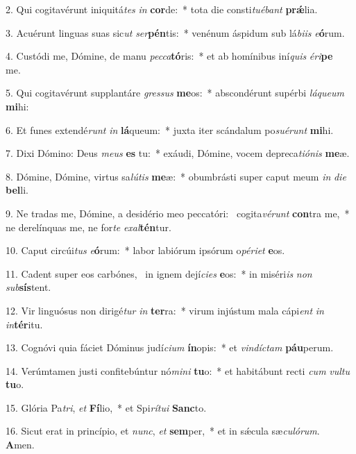 2. Qui cogitavérunt iniquitá\textit{tes} \textit{in} \textbf{cor}de:~*  tota die consti\textit{tu}\textit{é}\textit{bant} \textbf{prǽ}lia.\

3. Acuérunt linguas suas sic\textit{ut} \textit{ser}\textbf{pén}tis:~*  venénum áspidum sub lá\textit{bi}\textit{is} \textit{e}\textbf{ó}rum.\

4. Custódi me, Dómine, de manu \textit{pec}\textit{ca}\textbf{tó}ris:~*  et ab homínibus iní\textit{quis} \textit{é}\textit{ri}\textbf{pe} me.\

5. Qui cogitavérunt supplantáre \textit{gres}\textit{sus} \textbf{me}os:~*  abscondérunt supérbi \textit{lá}\textit{que}\textit{um} \textbf{mi}hi:\

6. Et funes extendé\textit{runt} \textit{in} \textbf{lá}queum:~*  juxta iter scándalum po\textit{su}\textit{é}\textit{runt} \textbf{mi}hi.\

7. Dixi Dómino: Deus \textit{me}\textit{us} \textbf{es} tu:~*  exáudi, Dómine, vocem depreca\textit{ti}\textit{ó}\textit{nis} \textbf{me}æ.\

8. Dómine, Dómine, virtus sa\textit{lú}\textit{tis} \textbf{me}æ:~*  obumbrásti super caput meum \textit{in} \textit{di}\textit{e} \textbf{bel}li.\

9. Ne tradas me, Dómine, a desidério meo peccatóri: \dag\  cogita\textit{vé}\textit{runt} \textbf{con}tra me,~*  ne derelínquas me, ne for\textit{te} \textit{ex}\textit{al}\textbf{tén}tur.\

10. Caput circúi\textit{tus} \textit{e}\textbf{ó}rum:~*  labor labiórum ipsórum o\textit{pé}\textit{ri}\textit{et} \textbf{e}os.\

11. Cadent super eos carbónes, \dag\  in ignem dejí\textit{ci}\textit{es} \textbf{e}os:~*  in miséri\textit{is} \textit{non} \textit{sub}\textbf{sís}tent.\

12. Vir linguósus non dirigé\textit{tur} \textit{in} \textbf{ter}ra:~*  virum injústum mala cápi\textit{ent} \textit{in} \textit{in}\textbf{tér}itu.\

13. Cognóvi quia fáciet Dóminus judí\textit{ci}\textit{um} \textbf{ín}opis:~*  et \textit{vin}\textit{díc}\textit{tam} \textbf{páu}perum.\

14. Verúmtamen justi confitebúntur nó\textit{mi}\textit{ni} \textbf{tu}o:~*  et habitábunt recti \textit{cum} \textit{vul}\textit{tu} \textbf{tu}o.\

15. Glória Pa\textit{tri}, \textit{et} \textbf{Fí}lio,~*  et Spi\textit{rí}\textit{tu}\textit{i} \textbf{Sanc}to.\

16. Sicut erat in princípio, et \textit{nunc}, \textit{et} \textbf{sem}per,~*  et in sǽcula sæ\textit{cu}\textit{ló}\textit{rum}. \textbf{A}men.\

